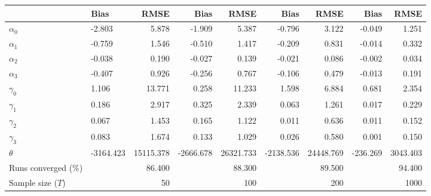 
\begin{tabular}[t]{llrrrrrrr}
\toprule
  & Bias & RMSE & Bias & RMSE & Bias & RMSE & Bias & RMSE\\
\midrule
$\alpha_{0}$ & -2.803 & 5.878 & -1.909 & 5.387 & -0.796 & 3.122 & -0.049 & 1.251\\
$\alpha_{1}$ & -0.759 & 1.546 & -0.510 & 1.417 & -0.209 & 0.831 & -0.014 & 0.332\\
$\alpha_{2}$ & -0.038 & 0.190 & -0.027 & 0.139 & -0.021 & 0.086 & -0.002 & 0.034\\
$\alpha_{3}$ & -0.407 & 0.926 & -0.256 & 0.767 & -0.106 & 0.479 & -0.013 & 0.191\\
$\gamma_{0}$ & 1.106 & 13.771 & 0.258 & 11.233 & 1.598 & 6.884 & 0.681 & 2.354\\
$\gamma_{1}$ & 0.186 & 2.917 & 0.325 & 2.339 & 0.063 & 1.261 & 0.017 & 0.229\\
$\gamma_{2}$ & 0.067 & 1.453 & 0.165 & 1.122 & 0.011 & 0.636 & 0.011 & 0.152\\
$\gamma_{3}$ & 0.083 & 1.674 & 0.133 & 1.029 & 0.026 & 0.580 & 0.001 & 0.150\\
$\theta$ & -3164.423 & 15115.378 & -2666.678 & 26321.733 & -2138.536 & 24448.769 & -236.269 & 3043.403\\
Runs converged (\%) &  & 86.400 &  & 88.300 &  & 89.500 &  & 94.400\\
Sample size ($T$) &  & 50 &  & 100 &  & 200 &  & 1000\\
\bottomrule
\end{tabular}
